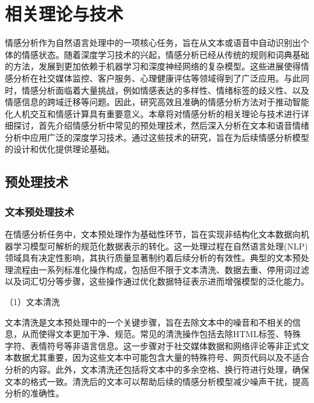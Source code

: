 
\chapter{相关理论与技术}

情感分析作为自然语言处理中的一项核心任务，旨在从文本或语音中自动识别出个体的情感状态。随着深度学习技术的兴起，情感分析已经从传统的规则和词典基础的方法，发展到更加依赖于机器学习和深度神经网络的复杂模型。这些进展使得情感分析在社交媒体监控、客户服务、心理健康评估等领域得到了广泛应用。与此同时，情感分析面临着大量挑战，例如情感表达的多样性、情绪标签的歧义性、以及情感信息的跨域迁移等问题。因此，研究高效且准确的情感分析方法对于推动智能化人机交互和情感计算具有重要意义。本章将对情感分析的相关理论与技术进行详细探讨，首先介绍情感分析中常见的预处理技术，然后深入分析在文本和语音情绪分析中应用广泛的深度学习技术。通过这些技术的研究，旨在为后续情感分析模型的设计和优化提供理论基础。

\section{预处理技术}

\subsection{文本预处理技术}

在情感分析任务中，文本预处理作为基础性环节，旨在实现非结构化文本数据向机器学习模型可解析的规范化数据表示的转化。这一处理过程在自然语言处理(NLP)领域具有决定性影响，其执行质量显著制约着后续分析的有效性。典型的文本预处理流程由一系列标准化操作构成，包括但不限于文本清洗、数据去重、停用词过滤以及词汇切分等步骤，这些操作通过优化数据特征表示进而增强模型的泛化能力。


（1）文本清洗

文本清洗是文本预处理中的一个关键步骤，旨在去除文本中的噪音和不相关的信息，从而使得文本更加干净、规范。常见的清洗操作包括去除HTML标签、特殊字符、表情符号等非语言信息。这一步骤对于社交媒体数据和网络评论等非正式文本数据尤其重要，因为这些文本中可能包含大量的特殊符号、网页代码以及不适合分析的内容。此外，文本清洗还包括将文本中的多余空格、换行符进行处理，确保文本的格式一致。清洗后的文本可以帮助后续的情感分析模型减少噪声干扰，提高分析的准确性。

